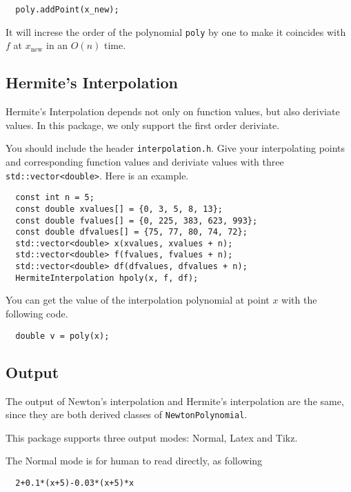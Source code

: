 \documentclass[11pt,en]{elegantpaper}
\begin{document}
\begin{lstlisting}
  poly.addPoint(x_new);
\end{lstlisting}

It will increse the order of the polynomial \verb|poly| by one to make it coincides with $f$ at $x_{\text{new}}$ in an $O(n)$ time.

\subsection{Hermite's Interpolation}

Hermite's Interpolation depends not only on function values, but also deriviate values. In this package, we only support the first order deriviate.

You should include the header \verb|interpolation.h|. Give your interpolating points and corresponding function values and deriviate values with three \verb|std::vector<double>|. Here is an example.

\begin{lstlisting}
  const int n = 5;
  const double xvalues[] = {0, 3, 5, 8, 13};
  const double fvalues[] = {0, 225, 383, 623, 993};
  const double dfvalues[] = {75, 77, 80, 74, 72};
  std::vector<double> x(xvalues, xvalues + n);
  std::vector<double> f(fvalues, fvalues + n);
  std::vector<double> df(dfvalues, dfvalues + n);
  HermiteInterpolation hpoly(x, f, df);
\end{lstlisting}

You can get the value of the interpolation polynomial at point $x$ with the following code.

\begin{lstlisting}
  double v = poly(x);
\end{lstlisting}

\subsection{Output}

The output of Newton's interpolation and Hermite's interpolation are the same, since they are both derived classes of \verb|NewtonPolynomial|.

This package supports three output modes: Normal, Latex and Tikz.

The Normal mode is for human to read directly, as following

\begin{lstlisting}
  2+0.1*(x+5)-0.03*(x+5)*x
\end{lstlisting}
\end{document}
